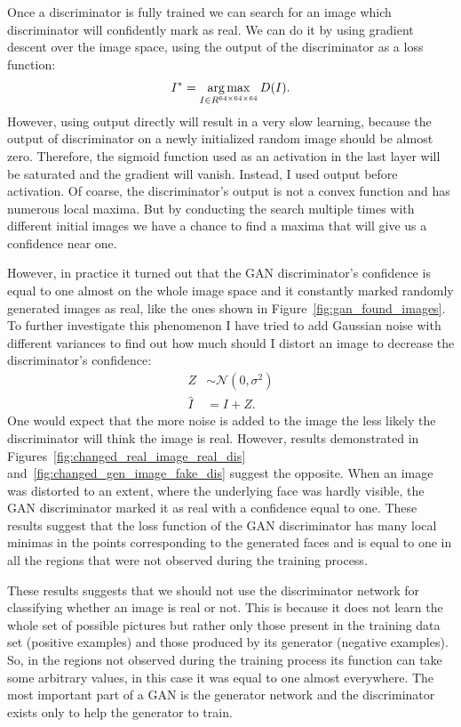 Once a discriminator is fully trained we can search for an image which discriminator will confidently mark as real. We can do it by using gradient descent over the image space, using the output of the discriminator as a loss function:
\begin{equation}
	I^* = \operatorname*{arg\,max}_{I \in R^{64 \times 64 \times 64}} D(I).
\end{equation} 
However, using output directly will result in a very slow learning, because the output of discriminator on a newly initialized random image should be almost zero. Therefore, the sigmoid function used as an activation in the last layer will be saturated and the gradient will vanish. Instead, I used output before activation. Of coarse, the discriminator's output is not a convex function and has numerous local maxima. But by conducting the search multiple times with different initial images we have a chance to find a maxima that will give us a confidence near one. 

However, in practice it turned out that the GAN discriminator's confidence is equal to one almost on the whole image space and it constantly marked randomly generated images as real, like the ones shown in Figure~\ref{fig:gan_found_images}. To further investigate this phenomenon I have tried to add Gaussian noise with different variances to find out how much should I distort an image to decrease the discriminator's confidence:
\begin{align*}
	Z &\sim \mathcal{N}(0, \sigma^2) \\
	\hat{I} &= I + Z.
\end{align*} One would expect that the more noise is added to the image the less likely the discriminator will think the image is real. However, results demonstrated in Figures~\ref{fig:changed_real_image_real_dis} and~\ref{fig:changed_gen_image_fake_dis} suggest the opposite. When an image was distorted to an extent, where the underlying face was hardly visible, the GAN discriminator marked it as real with a confidence equal to one. These results suggest that the loss function of the GAN discriminator has many local minimas in the points corresponding to the generated faces and is equal to one in all the regions that were not observed during the training process. 

These results suggests that we should not use the discriminator network for classifying whether an image is real or not. This is because it does not learn the whole set of possible pictures but rather only those present in the training data set (positive examples) and those produced by its generator (negative examples). So, in the regions not observed during the training process its function can take some arbitrary values, in this case it was equal to one almost everywhere. The most important part of a GAN is the generator network and the discriminator exists only to help the generator to train. 

